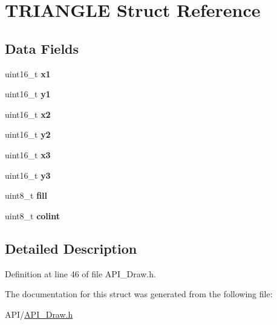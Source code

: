 \hypertarget{struct_t_r_i_a_n_g_l_e}{}\section{T\+R\+I\+A\+N\+G\+LE Struct Reference}
\label{struct_t_r_i_a_n_g_l_e}
\subsection*{Data Fields}
\begin{DoxyCompactItemize}
\item 
\mbox{\label{struct_t_r_i_a_n_g_l_e_aedb5fdfe3c1d1a915b668ba7f3950753}} 
uint16\+\_\+t {\bfseries x1}
\item 
\mbox{\label{struct_t_r_i_a_n_g_l_e_a47ada631c22a9d40348069145654f255}} 
uint16\+\_\+t {\bfseries y1}
\item 
\mbox{\label{struct_t_r_i_a_n_g_l_e_ac5bc000f8954f38b7a641a485a26bae7}} 
uint16\+\_\+t {\bfseries x2}
\item 
\mbox{\label{struct_t_r_i_a_n_g_l_e_aa377184ba406b3f0c4ac18c935378204}} 
uint16\+\_\+t {\bfseries y2}
\item 
\mbox{\label{struct_t_r_i_a_n_g_l_e_a2f8dbfe5dea533f606bd224181217ad5}} 
uint16\+\_\+t {\bfseries x3}
\item 
\mbox{\label{struct_t_r_i_a_n_g_l_e_a2922864d422c08ee7c383363fa3f8923}} 
uint16\+\_\+t {\bfseries y3}
\item 
\mbox{\label{struct_t_r_i_a_n_g_l_e_a2ffb43952012965173826ee9554c864a}} 
uint8\+\_\+t {\bfseries fill}
\item 
\mbox{\label{struct_t_r_i_a_n_g_l_e_a21caa4b27a71b7967f1a2d64f196a674}} 
uint8\+\_\+t {\bfseries colint}
\end{DoxyCompactItemize}


\subsection{Detailed Description}


Definition at line 46 of file A\+P\+I\+\_\+\+Draw.\+h.



The documentation for this struct was generated from the following file\+:\begin{DoxyCompactItemize}
\item 
A\+P\+I/\hyperlink{_a_p_i___draw_8h}{A\+P\+I\+\_\+\+Draw.\+h}\end{DoxyCompactItemize}
